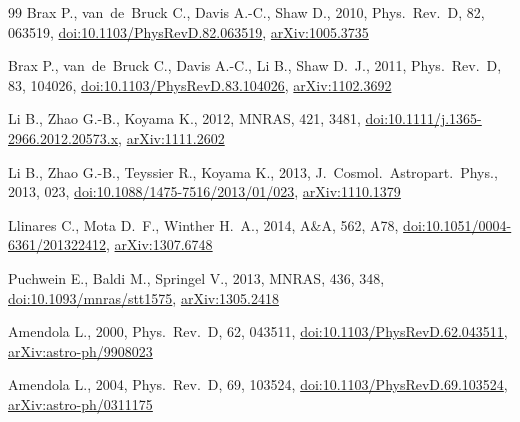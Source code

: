 \documentclass[fleqn,usenatbib]{mnras}
\begin{document}
\begin{thebibliography}{99}
Brax P., van~de~Bruck C., Davis A.-C., Shaw D., 2010, Phys.\ Rev.\ D, 82, 063519,
\href{https://doi.org/10.1103/PhysRevD.82.063519}{doi:10.1103/PhysRevD.82.063519},
\href{https://arxiv.org/abs/1005.3735}{arXiv:1005.3735}

Brax P., van~de~Bruck C., Davis A.-C., Li B., Shaw D.~J., 2011, Phys.\ Rev.\ D, 83, 104026,
\href{https://doi.org/10.1103/PhysRevD.83.104026}{doi:10.1103/PhysRevD.83.104026},
\href{https://arxiv.org/abs/1102.3692}{arXiv:1102.3692}

Li B., Zhao G.-B., Koyama K., 2012, MNRAS, 421, 3481,
\href{https://doi.org/10.1111/j.1365-2966.2012.20573.x}{doi:10.1111/j.1365-2966.2012.20573.x},
\href{https://arxiv.org/abs/1111.2602}{arXiv:1111.2602}

Li B., Zhao G.-B., Teyssier R., Koyama K., 2013, J.\ Cosmol.\ Astropart.\ Phys., 2013, 023,
\href{https://doi.org/10.1088/1475-7516/2013/01/023}{doi:10.1088/1475-7516/2013/01/023},
\href{https://arxiv.org/abs/1110.1379}{arXiv:1110.1379}

Llinares C., Mota D.~F., Winther H.~A., 2014, A\&A, 562, A78,
\href{https://doi.org/10.1051/0004-6361/201322412}{doi:10.1051/0004-6361/201322412},
\href{https://arxiv.org/abs/1307.6748}{arXiv:1307.6748}

Puchwein E., Baldi M., Springel V., 2013, MNRAS, 436, 348,
\href{https://doi.org/10.1093/mnras/stt1575}{doi:10.1093/mnras/stt1575},
\href{https://arxiv.org/abs/1305.2418}{arXiv:1305.2418}


Amendola L., 2000, Phys.\ Rev.\ D, 62, 043511,
\href{https://doi.org/10.1103/PhysRevD.62.043511}{doi:10.1103/PhysRevD.62.043511},
\href{https://arxiv.org/abs/astro-ph/9908023}{arXiv:astro-ph/9908023}

Amendola L., 2004, Phys.\ Rev.\ D, 69, 103524,
\href{https://doi.org/10.1103/PhysRevD.69.103524}{doi:10.1103/PhysRevD.69.103524},
\href{https://arxiv.org/abs/astro-ph/0311175}{arXiv:astro-ph/0311175}


\end{thebibliography}
\end{document}
